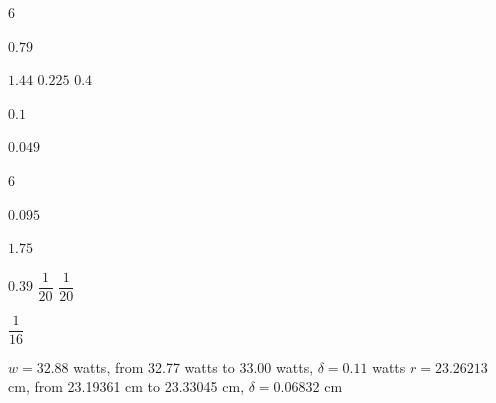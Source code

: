 \documentclass{book}
\begin{document}
\begin{appendices}
\begin{enumerate}[!HW!]
\begin{multicols}{6}
\item $0.79$
\item  $1.44$
\itemspade  $0.225$
\itemspade  $0.4$
\item  $0.1$
\item $0.049$
\end{multicols}
\begin{multicols}{6}
\item $0.095$
\item $1.75$
\item $0.39$
\itemspade $\dfrac{1}{20}$
\itemspade $\dfrac{1}{20}$
\item $\dfrac{1}{16}$
\end{multicols}

\itemspade $w = 32.88$ watts, from 32.77 watts to 33.00 watts, $\delta = 0.11$ watts
\itemspade $r = 23.26213$ cm, from 23.19361 cm to 23.33045 cm, $\delta = 0.06832$ cm 
\end{enumerate}
\vspace{-15 pt}


\end{appendices}
\end{document}
